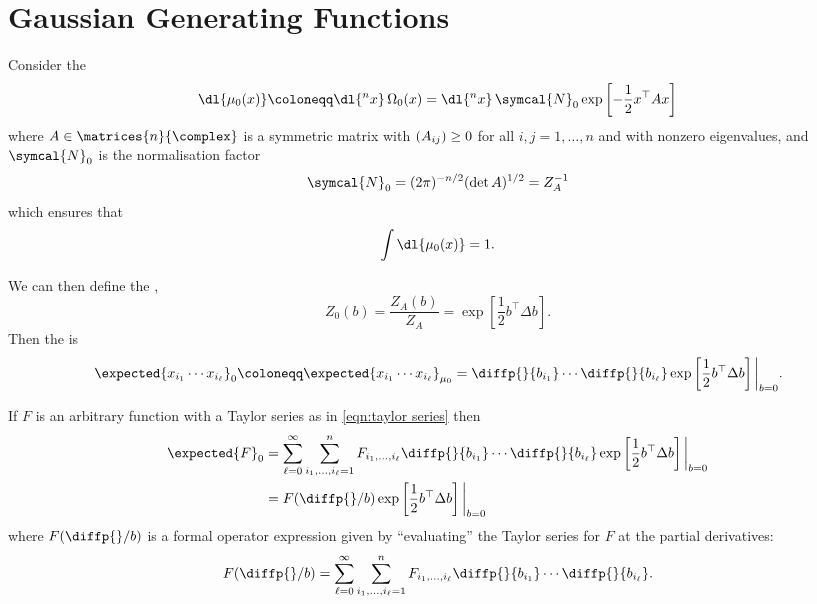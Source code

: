 \documentclass[fleqn]{NotesClass}
\let\Re\relax
\DeclareMathOperator{\Re}{Re}
\newcommand{\trans}{{\top}}
\begin{document}
    \section{Gaussian Generating Functions}
    Consider the 
    \begin{equation}
        \dl{\mu_0(x)} \coloneqq \dl{^nx} \, \Omega_0(x) = \dl{^n x} \, \symcal{N}_0 \exp\left[ -\frac{1}{2} x^\trans A x \right]
    \end{equation}
    where \(A \in \matrices{n}{\complex}\) is a symmetric matrix with \(\Re(A_{ij}) \ge 0\) for all \(i, j = 1, \dotsc, n\) and with nonzero eigenvalues, and \(\symcal{N}_0\) is the normalisation factor
    \begin{equation}
        \symcal{N}_0 = (2\pi)^{-n/2} (\det A)^{1/2} = Z_A^{-1}
    \end{equation}
    which ensures that
    \begin{equation}
        \int \dl{\mu_0(x)} = 1.
    \end{equation}
    
    We can then define the ,
    \begin{equation}
        Z_0(b) = \frac{Z_A(b)}{Z_A} = \exp\left[ \frac{1}{2} b^\trans \Delta b \right].
    \end{equation}
    Then the  is
    \begin{equation}
        \expected{x_{i_1} \dotsm x_{i_\ell}}_0 \coloneqq \expected{x_{i_1} \dotsm x_{i_\ell}}_{\mu_0} = \diffp{}{b_{i_1}} \dotsm \diffp{}{b_{i_\ell}} \exp\left[ \frac{1}{2}b^\trans \Delta b \right]\bigg|_{b = 0}.
    \end{equation}
    
    If \(F\) is an arbitrary function with a Taylor series as in \cref{eqn:taylor series} then
    \begin{align}
        \expected{F}_0 &= \sum_{\ell = 0}^{\infty} \sum_{i_1, \dotsc, i_\ell = 1}^{n} F_{i_1, \dotsc, i_{\ell}} \diffp{}{b_{i_1}} \dotsm \diffp{}{b_{i_{\ell}}} \exp\left[ \frac{1}{2} b^\trans \Delta b \right] \bigg|_{b = 0}\\
        &= F(\diffp{}/{b}) \exp\left[ \frac{1}{2} b^\trans \Delta b \right]\bigg|_{b = 0}
    \end{align}
    where \(F(\diffp{}/{b})\) is a formal operator expression given by \enquote{evaluating} the Taylor series for \(F\) at the partial derivatives:
    \begin{equation}
        F(\diffp{}/{b}) = \sum_{\ell = 0}^{\infty} \sum_{i_1, \dotsc, i_{\ell} = 1}^{n} F_{i_1, \dotsc, i_{\ell}} \diffp{}{b_{i_1}} \dotsm \diffp{}{b_{i_\ell}}.
    \end{equation}
    
\end{document}
